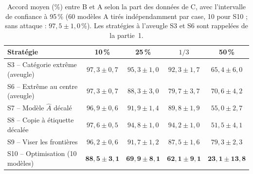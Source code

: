 \documentclass[11pt,a4paper]{article}
\begin{document}
\begin{table}[h]
\centering
\begin{tabularx}{\textwidth}{>{\raggedright\arraybackslash}p{5.0cm}CCCC}
\toprule
Stratégie & 10\,\% & 25\,\% & $1/3$ & 50\,\% \\
\midrule
S3 -- Catégorie extrême (aveugle)   & $97{,}3 \pm 0{,}7$ & $95{,}3 \pm 1{,}0$ & $92{,}3 \pm 1{,}7$ & $65{,}4 \pm 6{,}0$ \\
S6 -- Extrême au centre (aveugle)   & $97{,}3 \pm 0{,}7$ & $88{,}3 \pm 3{,}0$ & $79{,}7 \pm 3{,}7$ & $70{,}6 \pm 4{,}2$ \\
\midrule
S7 -- Modèle $\hat{A}$ décalé       & $96{,}9 \pm 0{,}6$ & $91{,}9 \pm 1{,}4$ & $89{,}8 \pm 1{,}9$ & $55{,}0 \pm 2{,}7$ \\
S8 -- Copie à étiquette décalée     & $97{,}6 \pm 0{,}5$ & $94{,}8 \pm 1{,}0$ & $94{,}2 \pm 1{,}0$ & $51{,}5 \pm 4{,}1$ \\
S9 -- Viser les frontières          & $96{,}2 \pm 0{,}6$ & $91{,}7 \pm 1{,}2$ & $87{,}5 \pm 1{,}6$ & $79{,}3 \pm 2{,}3$ \\
S10 -- Optimisation (10 modèles)    & $\mathbf{88{,}5 \pm 3{,}1}$ & $\mathbf{69{,}9 \pm 8{,}1}$ & $\mathbf{62{,}1 \pm 9{,}1}$ & $\mathbf{23{,}1 \pm 13{,}8}$ \\
\bottomrule
\end{tabularx}
\caption{Accord moyen (\%) entre B et A selon la part des données de C, avec l'intervalle de confiance à 95\,\%
(60 modèles A tirés indépendamment par case, 10 pour S10 ; sans attaque : $97{,}5 \pm 1{,}0$\,\%). Les stratégies à
l'aveugle S3 et S6 sont rappelées de la partie~1.}
\label{tab:informed}
\end{table}
\end{document}
